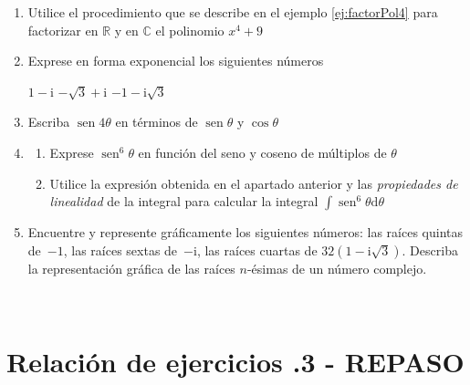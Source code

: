 \begin{enumerate}
\item
Utilice el procedimiento que se describe en el ejemplo \ref{ej:factorPol4} para factorizar en $\mathbb{R}$ y en $\mathbb{C}$ el polinomio $x^4+9$ 

\item
Exprese en forma exponencial los siguientes números
\setcontadoralph
\begin{centrar}
\nitem
$1-\mathrm{i}$\hfill
\nitem
$-\sqrt3+\mathrm{i}$\hfill
\nitem
$-1-\mathrm{i}\sqrt3$%
\end{centrar}


\item
Escriba $\operatorname{sen} 4\theta$ en términos de $\operatorname{sen}\theta$ y $\cos\theta$


\item
\begin{enumerate}
\item
Exprese $\operatorname{sen}^6\theta$ en función del seno y coseno de múltiplos de $\theta$
\item
Utilice la expresión obtenida en el apartado anterior y las \emph{propiedades de linealidad} de la integral para calcular la integral $\displaystyle\int\operatorname{sen}^6\theta\mathrm{d}\theta$
\end{enumerate}


\item Encuentre y represente gráficamente los siguientes números: las raíces quintas de~$-1$, 
las raíces sextas de~$-\mathrm{i}$, las raíces cuartas de $32(1-\mathrm{i}\sqrt{3})$.\newline
Describa la representación gráfica de las raíces $n$-ésimas de un número complejo.


\end{enumerate}


\newpage

\thispagestyle{empty}

\ 

\vfill
\newpage


\section*{Relación de ejercicios \thechapter.3 - REPASO}

